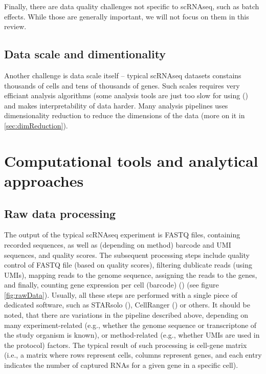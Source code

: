 Finally, there are data quality challenges not specific to scRNAseq, such as batch effects.
While those are generally important, we will not focus on them in this review.

\subsection{Data scale and dimentionality}

Another challenge is data scale itself – typical scRNAseq datasets constains thousands of cells and tens of thousands of genes.
Such scales requires very efficiant analysis algorithms (some analysis tools are just too slow for using (\cite{McCalla2023})
and makes interpretability of data harder.
Many analysis pipelines uses dimensionality reduction to reduce the dimensions of the data (more on it in \ref{sec:dimReduction}).

\section{Computational tools and analytical approaches}

\subsection{Raw data processing}

The output of the typical scRNAseq experiment is FASTQ files, containing recorded sequences,
as well as (depending on method) barcode and UMI sequences, and quality scores.
The subsequent processing steps include quality control of FASTQ file (based on quality scores),
filtering dublicate reads (using UMIs), mapping reads to the genome sequence, assigning the reads to the genes,
and finally, counting gene expression per cell (barcode) (\cite{Heumos2023}) (see figure \ref{fig:rawData}).
Usually, all these steps are performed with a single piece of dedicated software,
such as STARsolo (\cite{Kaminow2021}), CellRanger (\cite{Zheng2017}) or others.
It should be noted, that there are variations in the pipeline described above,
depending on many experiment-related (e.g., whether the genome sequence or transcriptone of the study organism is known),
or method-related (e.g., whether UMIs are used in the protocol) factors.
The typical result of such processing is cell-gene matrix (i.e., a matrix where rows represent cells,
columns represent genes, and each entry indicates the number of captured RNAs for a given gene in a specific cell).

